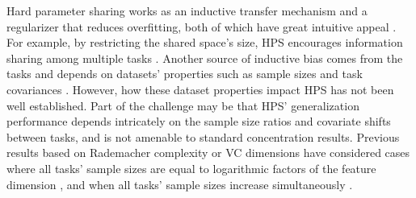 Hard parameter sharing works as an inductive transfer mechanism and a regularizer that reduces overfitting, both of which have great intuitive appeal \cite{R17}.
For example, by restricting the shared space's size, HPS encourages information sharing among multiple tasks \cite{KD12}.
Another source of inductive bias comes from the tasks and depends on datasets' properties such as sample sizes and task covariances \cite{WZR20}.
However, how these dataset properties impact HPS has not been well established.
Part of the challenge may be that HPS' generalization performance depends intricately on the sample size ratios and covariate shifts between tasks, and is not amenable to standard concentration results.
Previous results based on Rademacher complexity or VC dimensions have considered cases where all tasks' sample sizes are equal to logarithmic factors of the feature dimension \cite{B00,MPR16}, and when all tasks' sample sizes increase simultaneously \cite{AZ05,M06}.

